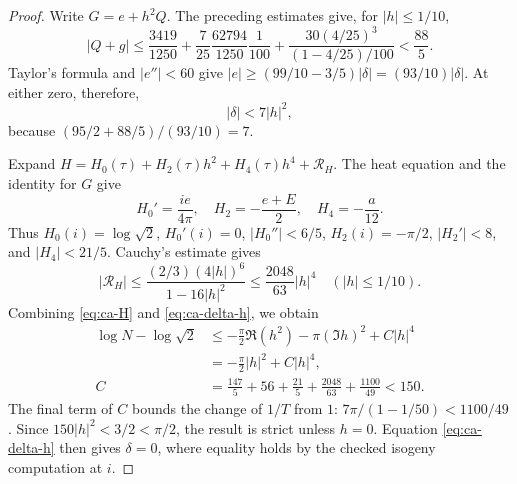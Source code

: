 \begin{proof}
Write $G=e+h^2Q$. The preceding estimates give, for $|h|\le1/10$,
\[
 |Q+g|\le
 \frac{3419}{1250}+\frac7{25}\frac{62794}{1250}\frac1{100}
       +\frac{30(4/25)^3}{(1-4/25)/100}<\frac{88}{5}.
\]
Taylor's formula and $|e''|<60$ give
$|e|\ge(99/10-3/5)|\delta|=(93/10)|\delta|$.
At either zero, therefore,
\begin{equation}\label{eq:ca-delta-h}
 |\delta|<7|h|^2,
\end{equation}
because $(95/2+88/5)/(93/10)=7$.

Expand
$H=H_0(\tau)+H_2(\tau)h^2+H_4(\tau)h^4+\mathcal R_H$.
The heat equation and the identity for $G$ give
\[
 H_0'=\frac{ie}{4\pi},\quad
 H_2=-\frac{e+E}{2},\quad H_4=-\frac a{12}.
\]
Thus $H_0(i)=\log\sqrt2$, $H_0'(i)=0$,
$|H_0''|<6/5$, $H_2(i)=-\pi/2$, $|H_2'|<8$, and
$|H_4|<21/5$. Cauchy's estimate gives
\[
 |\mathcal R_H|\le
 \frac{(2/3)(4|h|)^6}{1-16|h|^2}
 \le\frac{2048}{63}|h|^4
 \quad (|h|\le1/10).
\]
Combining \eqref{eq:ca-H} and \eqref{eq:ca-delta-h}, we obtain
\begin{align*}
 \log N-\log\sqrt2
 &\le-\frac\pi2\Re(h^2)-\pi(\Im h)^2+C|h|^4\\
 &=-\frac\pi2|h|^2+C|h|^4,\\
 C&=\frac{147}{5}+56+\frac{21}{5}
                 +\frac{2048}{63}+\frac{1100}{49}<150.
\end{align*}
The final term of $C$ bounds the change of $1/T$ from $1$:
$7\pi/(1-1/50)<1100/49$. Since $150|h|^2<3/2<\pi/2$,
the result is strict unless $h=0$. Equation
\eqref{eq:ca-delta-h} then gives $\delta=0$, where equality
holds by the checked isogeny computation at $i$.
\end{proof}
